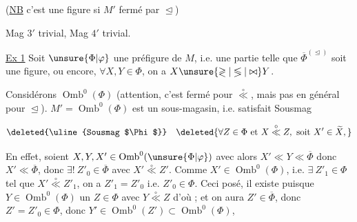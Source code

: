 (\uline{NB} c'est une figure si $M'$ fermé par $\trianglelefteq$)

Mag $3'$ trivial, Mag $4'$ trivial.

\uline{Ex 1} Soit $\unsure{\Phi|\varphi}$  une préfigure de $M$, i.e. une partie telle que $\overline\Phi^{(\trianglelefteq)}$ soit une figure, ou encore,  $\forall X,Y\in\Phi$, on a $X\unsure{\gtrless|\lessgtr|\bowtie}Y$.

Considérons $\operatorname{Omb}^{0}(\Phi)$ (attention, c'est fermé pour $\overset{\circ}{\ll}$, mais pas en général pour $\trianglelefteq$).   $M'=\operatorname{Omb}^{0}(\Phi)$ est un sous-magasin, i.e. satisfait Sousmag

\[
\text{\deleted{\uline{Sousmag $\Phi$}}}\quad
\deleted{\forall Z\in\Phi\text{ et }X\overset{\circ}{\ll}Z,\text{ soit }X'\in\widetilde X,}
\]


En effet, soient $X,Y,X'\in\operatorname{Omb}^{0}(\unsure{\Phi|\varphi})$ avec
alors $X'\ll Y\ll\overline\Phi$ donc $X'\ll\overline\Phi$, donc $\exists!\ Z'_0\in\overline\Phi$ avec $X'\overset{\circ}{\ll}Z'$. Comme $X'\in\operatorname{Omb}^{0}(\Phi)$, i.e. $\exists\ Z'_1\in\Phi$ tel que $X'\overset{\circ}{\ll}Z'_1$, on a $Z'_1=Z'_0$ i.e. $Z'_0\in\Phi$. Ceci posé, il existe puisque $Y\in\operatorname{Omb}^{0}(\Phi)$ un $Z\in\Phi$ avec $Y\overset{\circ}{\ll}Z$ d'où
; et on aura $Z'\in\overline\Phi$, donc $Z'=Z'_0\in\Phi$, donc $Y'\in\operatorname{Omb}^{0}(Z')\subset\operatorname{Omb}^{0}(\Phi)$, 

